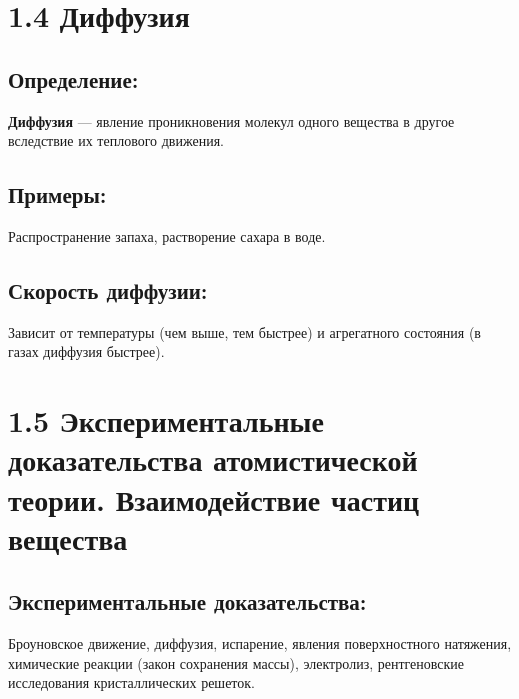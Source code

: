 \documentclass[a4paper,12pt]{article}
\begin{document}
\newpage


\section*{1.4 Диффузия}

\vspace{-9pt}
\subsection*{Определение:}
\vspace{-3pt}
\textbf{Диффузия} --- явление проникновения молекул одного вещества в другое вследствие их теплового движения.

\vspace{-9pt}
\subsection*{Примеры:}
\vspace{-3pt}
Распространение запаха, растворение сахара в воде.

\vspace{-9pt}
\subsection*{Скорость диффузии:}
\vspace{-3pt}
Зависит от температуры (чем выше, тем быстрее) и агрегатного состояния (в газах диффузия быстрее).


\section*{1.5 Экспериментальные доказательства атомистической теории. Взаимодействие частиц вещества}

\vspace{-9pt}
\subsection*{Экспериментальные доказательства:}
\vspace{-3pt} 
Броуновское движение, диффузия, испарение, явления поверхностного натяжения, химические реакции (закон сохранения массы), электролиз, рентгеновские исследования кристаллических решеток.

\vspace{-9pt}
\end{document}
